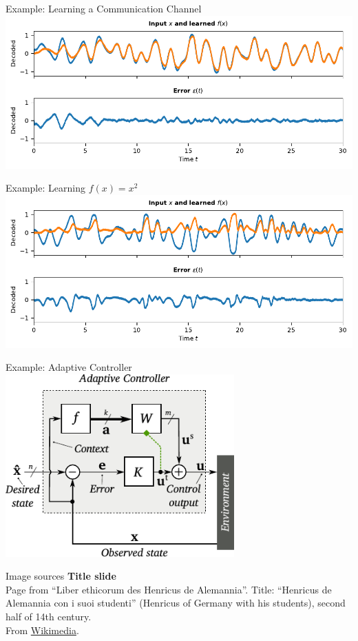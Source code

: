 \documentclass[handout,aspectratio=169]{beamer}
\begin{document}
	\begin{frame}{Example: Learning a Communication Channel}
		\includegraphics[width=\textwidth]{media/pes_communication_channel_example.pdf}
	\end{frame}

	\begin{frame}{Example: Learning $f(x) = x^2$}
		\includegraphics[width=\textwidth]{media/pes_square_example.pdf}
	\end{frame}

	\begin{frame}{Example: Adaptive Controller}
		\centering
		\includegraphics[height=7cm]{media/adaptive_controller.pdf}
	\end{frame}

	\backupbegin

	\begin{frame}[noframenumbering]{Image sources}
		\small
		\textbf{Title slide}\\Page from \enquote{Liber ethicorum des Henricus de Alemannia}. Title: \enquote{Henricus de Alemannia con i suoi studenti} (Henricus of Germany with his students), second half of 14th century.\\From \href{https://commons.wikimedia.org/wiki/File:Laurentius_de_Voltolina_001.jpg}{Wikimedia}.
	\end{frame}

	\backupend
	
\end{document}
